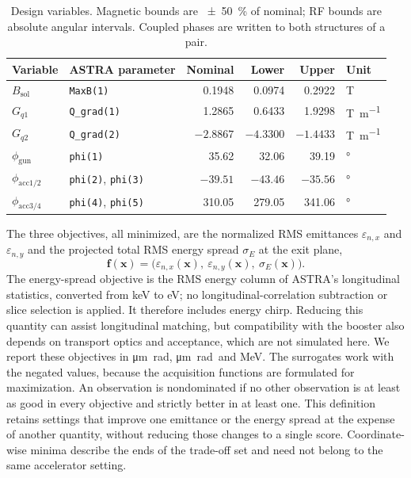 \documentclass[aps,prab,reprint,superscriptaddress,amsmath,amssymb,floatfix]{revtex4-2}
\newcommand{\enx}{\varepsilon_{n,x}}
\newcommand{\eny}{\varepsilon_{n,y}}
\newcommand{\umrad}{\si{\micro\metre\radian}}
\begin{document}
\begin{table}[htbp]
\centering
\caption{Design variables. Magnetic bounds are \SI{\pm50}{\percent} of nominal; RF bounds are
absolute angular intervals. Coupled phases are written to both structures of a pair.}
\label{tab:variables}
\begin{tabular}{llrrrl}
\toprule
Variable & ASTRA parameter & Nominal & Lower & Upper & Unit \\
\midrule
$B_\mathrm{sol}$ & \texttt{MaxB(1)} & 0.1948 & 0.0974 & 0.2922 & \si{\tesla} \\
$G_{q1}$ & \texttt{Q\_grad(1)} & 1.2865 & 0.6433 & 1.9298 & \si{\tesla\per\metre} \\
$G_{q2}$ & \texttt{Q\_grad(2)} & $-2.8867$ & $-4.3300$ & $-1.4433$ & \si{\tesla\per\metre} \\
$\phi_\mathrm{gun}$ & \texttt{phi(1)} & 35.62 & 32.06 & 39.19 & \si{\degree} \\
$\phi_\mathrm{acc1/2}$ & \texttt{phi(2)}, \texttt{phi(3)} & $-39.51$ & $-43.46$ & $-35.56$ & \si{\degree} \\
$\phi_\mathrm{acc3/4}$ & \texttt{phi(4)}, \texttt{phi(5)} & 310.05 & 279.05 & 341.06 & \si{\degree} \\
\bottomrule
\end{tabular}
\end{table}

The three objectives, all minimized, are the normalized RMS emittances $\enx$ and $\eny$ and the
projected total RMS energy spread $\sigma_E$ at the exit plane,
\begin{equation}
  \mathbf{f}(\mathbf{x}) = \bigl(\enx(\mathbf{x}),\ \eny(\mathbf{x}),\ \sigma_E(\mathbf{x})\bigr).
\end{equation}
The energy-spread objective is the RMS energy column of ASTRA's longitudinal statistics,
converted from \si{\kilo\electronvolt} to \si{\electronvolt}; no longitudinal-correlation
subtraction or slice selection is applied. It therefore includes energy chirp. Reducing this
quantity can assist longitudinal matching, but compatibility with the booster also depends on
transport optics and acceptance, which are not simulated here.
We report these objectives in \umrad, \umrad\ and \si{\mega\electronvolt}. The surrogates work with
the negated
values, because the acquisition functions are formulated for maximization. An observation is
nondominated if no other observation is at least as good in every objective and strictly better
in at least one. This definition retains settings that improve one emittance or the energy spread at
the expense
of another quantity, without reducing those changes to a single score. Coordinate-wise minima
describe the ends of the trade-off set and need not belong to the same accelerator setting.
\end{document}
